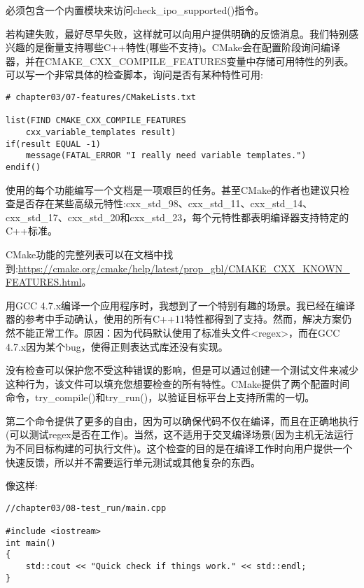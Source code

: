 必须包含一个内置模块来访问check\_ipo\_supported()指令。


若构建失败，最好尽早失败，这样就可以向用户提供明确的反馈消息。我们特别感兴趣的是衡量支持哪些C++特性(哪些不支持)。CMake会在配置阶段询问编译器，并在CMAKE\_CXX\_COMPILE\_FEATURES变量中存储可用特性的列表。可以写一个非常具体的检查脚本，询问是否有某种特性可用:

\begin{lstlisting}[style=styleCMake]
# chapter03/07-features/CMakeLists.txt

list(FIND CMAKE_CXX_COMPILE_FEATURES
	cxx_variable_templates result)
if(result EQUAL -1)
	message(FATAL_ERROR "I really need variable templates.")
endif()
\end{lstlisting}

使用的每个功能编写一个文档是一项艰巨的任务。甚至CMake的作者也建议只检查是否存在某些高级元特性:cxx\_std\_98、cxx\_std\_11、cxx\_std\_14、cxx\_std\_17、cxx\_std\_20和cxx\_std\_23，每个元特性都表明编译器支持特定的C++标准。

CMake功能的完整列表可以在文档中找到:\url{https://cmake.org/cmake/help/latest/prop_gbl/CMAKE_CXX_KNOWN_ FEATURES.html}。


用GCC 4.7.x编译一个应用程序时，我想到了一个特别有趣的场景。我已经在编译器的参考中手动确认，使用的所有C++11特性都得到了支持。然而，解决方案仍然不能正常工作。原因：因为代码默认使用了标准头文件<regex>，而在GCC 4.7.x因为某个bug，使得正则表达式库还没有实现。

没有检查可以保护您不受这种错误的影响，但是可以通过创建一个测试文件来减少这种行为，该文件可以填充您想要检查的所有特性。CMake提供了两个配置时间命令，try\_compile()和try\_run()，以验证目标平台上支持所需的一切。

第二个命令提供了更多的自由，因为可以确保代码不仅在编译，而且在正确地执行(可以测试regex是否在工作)。当然，这不适用于交叉编译场景(因为主机无法运行为不同目标构建的可执行文件)。这个检查的目的是在编译工作时向用户提供一个快速反馈，所以并不需要运行单元测试或其他复杂的东西。

像这样:

\begin{lstlisting}[style=styleCXX]
//chapter03/08-test_run/main.cpp

#include <iostream>
int main()
{
	std::cout << "Quick check if things work." << std::endl;
}
\end{lstlisting}

